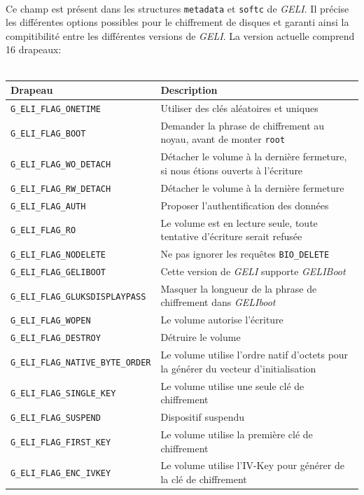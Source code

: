\paragraph{}
Ce champ est présent dans les structures \texttt{metadata} et \texttt{softc} de
\textit{GELI}. Il précise les différentes options possibles pour le chiffrement
de disques et garanti ainsi la compitibilité entre les différentes versions de
\textit{GELI}. La version actuelle comprend 16 drapeaux: \\
\\
\begin{tabularx}{\linewidth}{ | l | X | }
  \hline
  \textbf{Drapeau}                            & \textbf{Description} \\
  \hline
  \texttt{G\_ELI\_FLAG\_ONETIME}             & Utiliser des clés aléatoires et
  uniques \\
  \texttt{G\_ELI\_FLAG\_BOOT}                & Demander la phrase de
  chiffrement au noyau, avant de monter \texttt{root} \\
  \texttt{G\_ELI\_FLAG\_WO\_DETACH}          & Détacher le volume à la dernière
  fermeture, si nous étions ouverts à l'écriture \\
  \texttt{G\_ELI\_FLAG\_RW\_DETACH}          & Détacher le volume à la dernière
  fermeture \\
  \texttt{G\_ELI\_FLAG\_AUTH}                & Proposer l'authentification des
  données \\
  \texttt{G\_ELI\_FLAG\_RO}                  & Le volume est en lecture seule,
  toute tentative d'écriture serait refusée \\
  \texttt{G\_ELI\_FLAG\_NODELETE}            & Ne pas ignorer les requêtes
  \texttt{BIO\_DELETE} \\
  \texttt{G\_ELI\_FLAG\_GELIBOOT}           & Cette version de \textit{GELI}
  supporte \textit{GELIBoot} \\
  \texttt{G\_ELI\_FLAG\_GLUKSDISPLAYPASS}    & Masquer la longueur de la phrase
  de chiffrement dans \textit{GELIboot} \\
  \texttt{G\_ELI\_FLAG\_WOPEN}               & Le volume autorise l'écriture \\
  \texttt{G\_ELI\_FLAG\_DESTROY}             & Détruire le volume \\
  \texttt{G\_ELI\_FLAG\_NATIVE\_BYTE\_ORDER} & Le volume utilise l'ordre natif
  d'octets pour la générer du vecteur d'initialisation \\
  \texttt{G\_ELI\_FLAG\_SINGLE\_KEY}         & Le volume utilise une seule clé
  de chiffrement \\
  \texttt{G\_ELI\_FLAG\_SUSPEND}             & Dispositif suspendu \\
  \texttt{G\_ELI\_FLAG\_FIRST\_KEY}          & Le volume utilise la première
  clé de chiffrement \\
  \texttt{G\_ELI\_FLAG\_ENC\_IVKEY}          & Le volume utilise l'IV-Key pour
  générer de la clé de chiffrement \\
  \hline
\end{tabularx}
